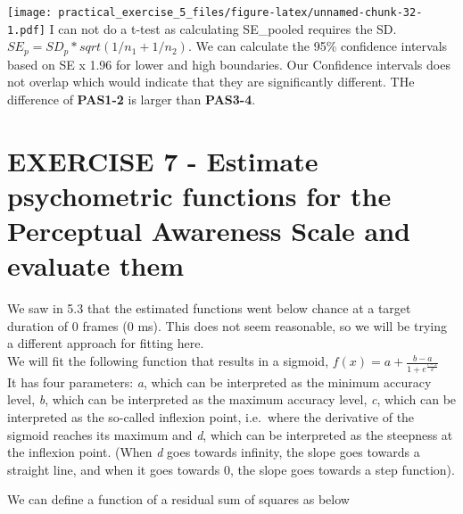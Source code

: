\documentclass[
]{article}
\begin{document}
\texttt{[image: practical\_exercise\_5\_files/figure-latex/unnamed-chunk-32-1.pdf]}
I can not do a t-test as calculating SE\_pooled requires the SD.
\(SE_p = SD_p * sqrt(1/n_1 + 1/n_2)\). We can calculate the 95\%
confidence intervals based on SE x 1.96 for lower and high boundaries.
Our Confidence intervals does not overlap which would indicate that they
are significantly different. THe difference of \textbf{PAS1-2} is larger
than \textbf{PAS3-4}.

\hypertarget{exercise-7---estimate-psychometric-functions-for-the-perceptual-awareness-scale-and-evaluate-them}{%
\section{EXERCISE 7 - Estimate psychometric functions for the Perceptual
Awareness Scale and evaluate
them}\label{exercise-7---estimate-psychometric-functions-for-the-perceptual-awareness-scale-and-evaluate-them}}

We saw in 5.3 that the estimated functions went below chance at a target
duration of 0 frames (0 ms). This does not seem reasonable, so we will
be trying a different approach for fitting here.\\
We will fit the following function that results in a sigmoid,
\(f(x) = a + \frac {b - a} {1 + e^{\frac {c-x} {d}}}\)\\
It has four parameters: \emph{a}, which can be interpreted as the
minimum accuracy level, \emph{b}, which can be interpreted as the
maximum accuracy level, \emph{c}, which can be interpreted as the
so-called inflexion point, i.e.~where the derivative of the sigmoid
reaches its maximum and \emph{d}, which can be interpreted as the
steepness at the inflexion point. (When \emph{d} goes towards infinity,
the slope goes towards a straight line, and when it goes towards 0, the
slope goes towards a step function).

We can define a function of a residual sum of squares as below
\end{document}
